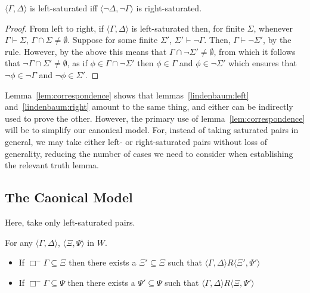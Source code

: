 \documentclass[10pt]{article}
\begin{document}
\begin{lemma}[Correspondence]\label{lem:correspondence}
  \(\langle \Gamma,\Delta \rangle\) is left-saturated iff \(\langle \lnot\Delta,\lnot\Gamma \rangle\) is right-saturated.
  \begin{proof}
    From left to right, if \(\langle \Gamma,\Delta \rangle\) is left-saturated then, for finite \(\Sigma\), whenever \(\Gamma \vdash \Sigma\), \(\Gamma \cap \Sigma \ne \emptyset\).
    Suppose for some finite \(\Sigma'\), \(\Sigma' \vdash \lnot\Gamma\).
    Then, \(\Gamma \vdash \lnot\Sigma'\), by {\color{red} the rule}.
    However, by the above this means that \(\Gamma \cap \lnot\Sigma' \ne \emptyset\), from which it follows that \(\lnot\Gamma \cap \Sigma' \ne \emptyset\), as if \(\phi \in \Gamma \cap \lnot\Sigma'\) then \(\phi \in \Gamma\) and \(\phi \in \lnot\Sigma'\) which ensures that \(\lnot\phi \in \lnot\Gamma\) and \(\lnot\phi \in \Sigma'\).
  \end{proof}
\end{lemma}

Lemma~\ref{lem:correspondence} shows that lemmas~\ref{lindenbaum:left} and~\ref{lindenbaum:right} amount to the same thing, and either can be indirectly used to prove the other.
However, the primary use of lemma~\ref{lem:correspondence} will be to simplify our canonical model.
For, instead of taking saturated pairs in general, we may take either left- or right-saturated pairs without loss of generality, reducing the number of cases we need to consider when establishing the relevant truth lemma.


\subsection{The Caonical Model}
\label{sec:caonical-model}


\begin{definition}
  Here, take only left-saturated pairs.
\end{definition}

\begin{lemma}
  For any \(\langle \Gamma,\Delta \rangle\), \(\langle \Xi,\Psi \rangle\) in \(W\).
  \begin{itemize}
  \item If \(\Box^{-}\Gamma \subseteq \Xi\) then there exists a \(\Xi' \subseteq \Xi\) such that \(\langle \Gamma,\Delta \rangle R \langle \Xi',\Psi' \rangle\)
  \item If \(\Box^{-}\Gamma \subseteq \Psi\) then there exists a \(\Psi' \subseteq \Psi\) such that \(\langle \Gamma,\Delta \rangle R \langle \Xi,\Psi' \rangle\)
  \end{itemize}
\end{lemma}
\end{document}
